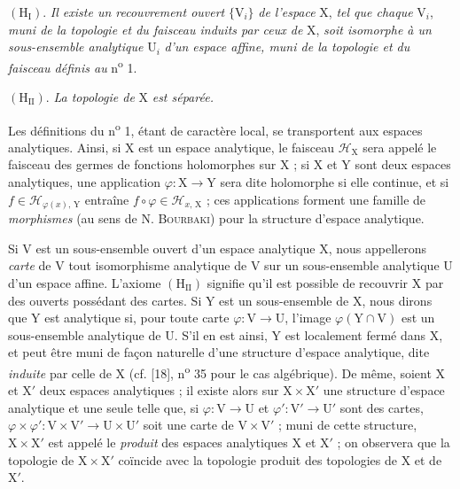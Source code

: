 $(\mathrm{H}_{\mathrm{I}})$. \emph{Il existe un recouvrement ouvert} $\{\mathrm{V}_i\}$ \emph{de l'espace} $\mathrm{X}$, \emph{tel que chaque} $\mathrm{V}_i$, \emph{muni de la topologie et du faisceau induits par ceux de} $\mathrm{X}$, \emph{soit isomorphe à un sous-ensemble analytique} $\mathrm{U}_i$ \emph{d'un espace affine, muni de la topologie et du faisceau définis au} n\textsuperscript{o} 1.

$(\mathrm{H}_{\mathrm{II}})$. \emph{La topologie de} $\mathrm{X}$ \emph{est séparée.}

Les définitions du n\textsuperscript{o} 1, étant de caractère local, se transportent aux espaces analytiques. Ainsi, si $\mathrm{X}$ est un espace analytique, le faisceau $\mathcal{H}_{\mathrm{X}}$ sera appelé le faisceau des germes de fonctions holomorphes sur $\mathrm{X}$ ; si $\mathrm{X}$ et $\mathrm{Y}$ sont deux espaces analytiques, une application $\varphi : \mathrm{X} \to \mathrm{Y}$ sera dite holomorphe si elle continue, et si $f \in \mathcal{H}_{\varphi(x),\,\mathrm{Y}}$ entraîne $f \circ \varphi \in \mathcal{H}_{x,\,\mathrm{X}}$ ; ces applications forment une famille de \emph{morphismes} (au sens de N. \textsc{Bourbaki}) pour la structure d'espace analytique.



Si $\mathrm{V}$ est un sous-ensemble ouvert d'un espace analytique $\mathrm{X}$, nous appellerons \textit{carte} de $\mathrm{V}$ tout isomorphisme analytique de $\mathrm{V}$ sur un sous-ensemble analytique $\mathrm{U}$ d'un espace affine. L'axiome $(\mathrm{H}_{\mathrm{II}})$ signifie qu'il est possible de recouvrir $\mathrm{X}$ par des ouverts possédant des cartes. Si $\mathrm{Y}$ est un sous-ensemble de $\mathrm{X}$, nous dirons que $\mathrm{Y}$ est analytique si, pour toute carte $\varphi : \mathrm{V} \to \mathrm{U}$, l'image $\varphi(\mathrm{Y} \cap \mathrm{V})$ est un sous-ensemble analytique de $\mathrm{U}$. S'il en est ainsi, $\mathrm{Y}$ est localement fermé dans $\mathrm{X}$, et peut être muni de façon naturelle d'une structure d'espace analytique, dite \textit{induite} par celle de $\mathrm{X}$ (cf. [18], n\textsuperscript{o} 35 pour le cas algébrique). De même, soient $\mathrm{X}$ et $\mathrm{X}'$ deux espaces analytiques ; il existe alors sur $\mathrm{X} \times \mathrm{X}'$ une structure d'espace analytique et une seule telle que, si $\varphi : \mathrm{V} \to \mathrm{U}$ et $\varphi' : \mathrm{V}' \to \mathrm{U}'$ sont des cartes, $\varphi \times \varphi' : \mathrm{V} \times \mathrm{V}' \to \mathrm{U} \times \mathrm{U}'$ soit une carte de $\mathrm{V} \times \mathrm{V}'$ ; muni de cette structure, $\mathrm{X} \times \mathrm{X}'$ est appelé le \textit{produit} des espaces analytiques $\mathrm{X}$ et $\mathrm{X}'$ ; on observera que la topologie de $\mathrm{X} \times \mathrm{X}'$ coïncide avec la topologie produit des topologies de $\mathrm{X}$ et de $\mathrm{X}'$.

